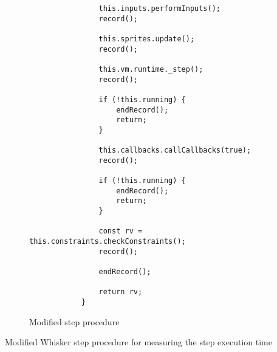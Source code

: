 \begin{listing}[htpb]
\begin{subfigure}[b]{.40\textwidth}
\begin{verbatim}
                this.inputs.performInputs();
                record();

                this.sprites.update();
                record();

                this.vm.runtime._step();
                record();

                if (!this.running) {
                    endRecord();
                    return;
                }

                this.callbacks.callCallbacks(true);
                record();

                if (!this.running) {
                    endRecord();
                    return;
                }

                const rv = this.constraints.checkConstraints();
                record();

                endRecord();

                return rv;
            }
        \end{verbatim}
        \vspace{-\bigskipamount}
        \caption{Modified step procedure}
    \end{subfigure}
    \caption{Modified Whisker step procedure for measuring the step execution time}
    \label{lst:time_measurement_code}
\end{listing}

